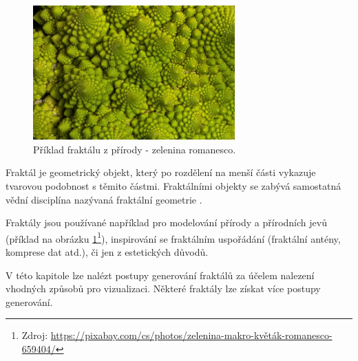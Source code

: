 \documentclass[thesis=B, czech]{FITthesis}[2019/03/06]
\begin{document}
\begin{figure}[h]
    \centering
    \includegraphics[width=220pt]{images/romanesco.jpg}
        \caption[Příklad fraktálu z přírody - zelenina romanesco.]{Příklad fraktálu z přírody - zelenina romanesco.}
        

        \label{fig:romanesco}
\end{figure}


Fraktál je geometrický objekt, který po rozdělení na menší části vykazuje tvarovou podobnost s těmito částmi. Fraktálními objekty se zabývá samostatná vědní disciplína nazývaná fraktální geometrie \cite{resersePaus}. 


Fraktály jsou používané například pro modelování přírody a přírodních jevů (příklad na obrázku \ref{fig:romanesco}\footnote{Zdroj: \url{https://pixabay.com/cs/photos/zelenina-makro-květák-romanesco-659404/}}), inspirování se fraktálním uspořádání (fraktální antény, komprese dat atd.), či jen z estetických důvodů.

V této kapitole lze nalézt postupy generování fraktálů za účelem nalezení vhodných způsobů pro vizualizaci. Některé fraktály lze získat více postupy generování.


\pagebreak



\end{document}
